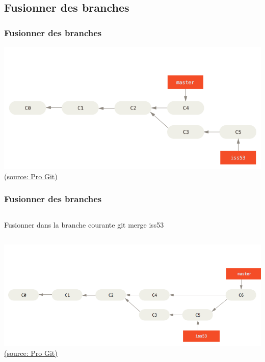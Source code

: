 \documentclass[t,11pt]{beamer}
\begin{document}
\subsection{Fusionner des branches}

\begin{frame}
        \frametitle{Fusionner des branches}
        \centering
        \includegraphics[width=\linewidth,height=0.8\textheight,keepaspectratio]{./img/basic-branching-6}
        \newline
        \href{https://git-scm.com/book/fr/v1/Les-branches-avec-Git-Ce-qu-est-une-branche}{{\tiny (source: Pro Git)}}
\end{frame}

\begin{frame}
        \frametitle{Fusionner des branches}
        \begin{columns}
                \begin{block}{Fusionner dans la branche courante}
                        git merge iss53
                \end{block}
        \end{columns}
        \vspace{-5mm}
        \centering
        \includegraphics[width=\linewidth,height=0.8\textheight,keepaspectratio]{./img/basic-merging-2}
        \newline
        \href{https://git-scm.com/book/fr/v1/Les-branches-avec-Git-Ce-qu-est-une-branche}{{\tiny (source: Pro Git)}}
\end{frame}
\end{document}
